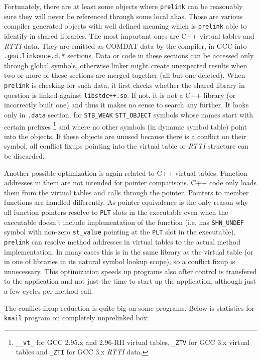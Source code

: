 \documentclass[twoside]{article}
\def\tts#1{\texttt{\small #1}}
\begin{document}
Fortunately, there are at least some objects where \tts{prelink}
can be reasonably sure they will never be referenced through some
local alias.  Those are various compiler generated objects with
well defined meaning which is \tts{prelink} able to identify
in shared libraries.  The most important ones are C++ virtual tables
and {\sl RTTI} data.  They are emitted as COMDAT data by the compiler,
in GCC into \tts{.gnu.linkonce.d.*} sections.  Data or code in these
sections can be accessed only through global symbols, otherwise linker
might create unexpected results when two or more of these sections
are merged together (all but one deleted).  When \tts{prelink} is checking
for such data, it first checks whether the shared library in question
is linked against \tts{libstdc++.so}.  If not, it is not a C++ library
(or incorrectly built one) and thus it makes no sense to search any further.
It looks only in \tts{.data} section, for \tts{STB\_WEAK} \tts{STT\_OBJECT}
symbols whose names start with certain prefixes
\footnote{\tts{\_\_vt\_} for GCC 2.95.x and 2.96-RH virtual tables,
\tts{\_ZTV} for GCC 3.x virtual tables and \tts{\_ZTI} for GCC 3.x {\sl RTTI} data.}
and where no other symbols (in dynamic symbol table) point into the objects.
If these objects are unused because there is a conflict on their symbol,
all conflict fixups pointing into the virtual table or {\sl RTTI} structure
can be discarded.

Another possible optimization is again related to C++ virtual tables.
Function addresses in them are not intended for pointer comparisons.
C++ code only loads them from the virtual tables and calls through
the pointer.  Pointers to member functions are handled differently.
As pointer equivalence is the only reason why all function pointers
resolve to \tts{PLT} slots in the executable even when the executable doesn't
include implementation of the function (i.e. has \tts{SHN\_UNDEF} symbol
with non-zero \tts{st\_value} pointing at the \tts{PLT} slot in the
executable), \tts{prelink} can resolve method addresses in virtual tables
to the actual method implementation.  In many cases this is in the same
library as the virtual table (or in one of libraries in its natural
symbol lookup scope), so a conflict fixup is unnecessary.
This optimization speeds up programs also after control is transfered
to the application and not just the time to start up the application,
although just a few cycles per method call.

The conflict fixup reduction is quite big on some programs.
Below is statistics for \tts{kmail} program on completely unprelinked box:
\end{document}
